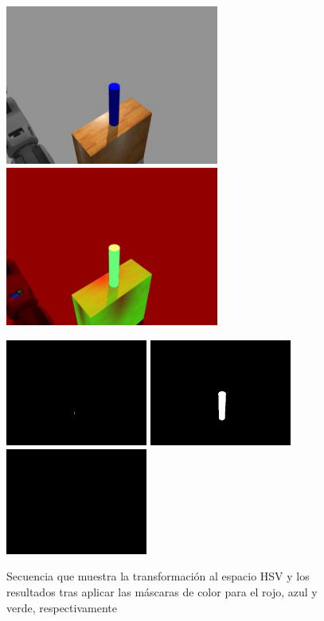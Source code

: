 \documentclass[12pt,spanish,chapterprefix, numbers=noenddot]{book}
\numberwithin{equation}{section}
\numberwithin{figure}{section}
\begin{document}
\begin{figure}[hbt!]
\centering
\includegraphics[width=7cm]{Figs/fase2_1.jpeg}
\includegraphics[width=7cm]{Figs/fase2_2.jpeg}
\par
\centering
\includegraphics[width=4.66cm]{Figs/red_mask.jpeg}
\includegraphics[width=4.66cm]{Figs/blue_mask.jpeg}
\includegraphics[width=4.66cm]{Figs/green_mask.jpeg}
\par
\caption{\label{fig:masks}Secuencia que muestra la transformación al espacio HSV y los resultados tras aplicar las máscaras de color para el rojo, azul y verde, respectivamente}
\end{figure}
\end{document}
